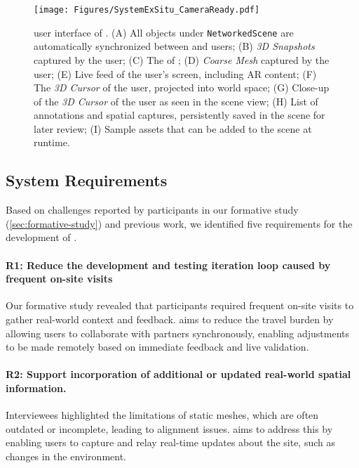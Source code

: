 \begin{figure*}
    \centering
    \texttt{[image: Figures/SystemExSitu\_CameraReady.pdf]}
    \caption{\Exsitu user interface of \SystemName. \textsf{(A)} All objects under \texttt{NetworkedScene} are automatically synchronized between \exsitu and \insitu users; \textsf{(B)} \textit{3D Snapshots} captured by the \insitu user; \textsf{(C)} The \locMesh of \locA; \textsf{(D)} \textit{Coarse Mesh} captured by the \insitu user; \textsf{(E)} Live feed of the \insitu user's screen, including AR content; \textsf{(F)} The \textit{3D Cursor} of the \exsitu user, projected into world space; \textsf{(G)} Close-up of the \textit{3D Cursor} of the \exsitu user as seen in the scene view; \textsf{(H)} List of annotations and spatial captures, persistently saved in the scene for later review; \textsf{(I)} Sample assets that can be added to the scene at runtime.}
    \label{fig:exsitu-system-overview}
\end{figure*}

\subsection{System Requirements}\label{sec:system:requirements}
Based on challenges reported by participants in our formative study (\cref{sec:formative-study}) and previous work, we identified five requirements for the development of \SystemName.

\paragraph{\normalfont\textbf{R1: Reduce the development and testing iteration loop caused by frequent on-site visits}} Our formative study revealed that participants required frequent on-site visits to gather real-world context and feedback. \SystemName aims to reduce the travel burden by allowing \exsitu users to collaborate with \insitu partners synchronously, enabling adjustments to be made remotely based on immediate feedback and live validation.

\paragraph{\normalfont\textbf{R2: Support incorporation of additional or updated real-world spatial information.}} Interviewees highlighted the limitations of static meshes, which are often outdated or incomplete, leading to alignment issues. \SystemName aims to address this by enabling \insitu users to capture and relay real-time updates about the site, such as changes in the environment.

